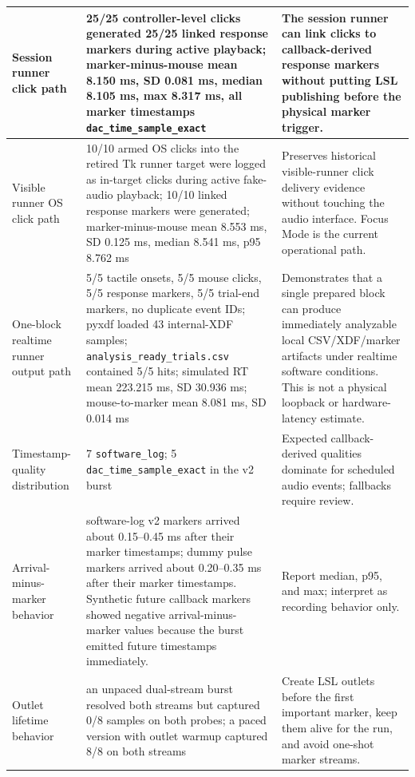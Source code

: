 \documentclass[11pt]{article}
\begin{document}
\begin{longtable}{|p{}|p{}|p{}|}
\hline
Session runner click path & 25/25 controller-level clicks generated 25/25
linked response markers during active playback; marker-minus-mouse mean 8.150
ms, SD 0.081 ms, median 8.105 ms, max 8.317 ms, all marker timestamps
\texttt{dac\_time\_sample\_exact} & The session runner can link clicks to
callback-derived response markers without putting LSL publishing before the
physical marker trigger. \\
\hline
Visible runner OS click path & 10/10 armed OS clicks into the retired Tk runner
target were logged as in-target clicks during active fake-audio playback; 10/10
linked response markers were generated; marker-minus-mouse mean 8.553 ms, SD
0.125 ms, median 8.541 ms, p95 8.762 ms & Preserves historical visible-runner
click delivery evidence without touching the audio interface. Focus Mode is the
current operational path. \\
\hline
One-block realtime runner output path & 5/5 tactile onsets, 5/5 mouse clicks,
5/5 response markers, 5/5 trial-end markers, no duplicate event IDs; pyxdf
loaded 43 internal-XDF samples; \texttt{analysis\_ready\_trials.csv} contained
5/5 hits; simulated RT mean 223.215 ms, SD 30.936 ms; mouse-to-marker mean
8.081 ms, SD 0.014 ms & Demonstrates that a single prepared block can produce
immediately analyzable local CSV/XDF/marker artifacts under realtime software
conditions. This is not a physical loopback or hardware-latency estimate. \\
\hline
Timestamp-quality distribution & 7 \texttt{software\_log}; 5
\texttt{dac\_time\_sample\_exact} in the v2 burst & Expected callback-derived
qualities dominate for scheduled audio events; fallbacks require review. \\
\hline
Arrival-minus-marker behavior & software-log v2 markers arrived about
0.15--0.45 ms after their marker timestamps; dummy pulse markers arrived about
0.20--0.35 ms after their marker timestamps. Synthetic future callback markers
showed negative arrival-minus-marker values because the burst emitted future
timestamps immediately. & Report median, p95, and max; interpret as recording
behavior only. \\
\hline
Outlet lifetime behavior & an unpaced dual-stream burst resolved both streams
but captured 0/8 samples on both probes; a paced version with outlet warmup
captured 8/8 on both streams & Create LSL outlets before the first important
marker, keep them alive for the run, and avoid one-shot marker streams. \\
\hline
\end{longtable}
\end{document}
